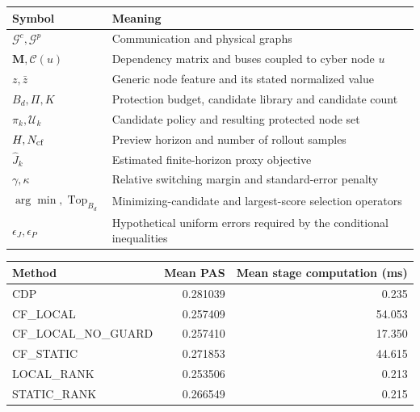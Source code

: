 \documentclass[10pt]{article}
\makeatletter
\newenvironment{exporttable}{\par\noindent\begin{minipage}{\linewidth}\def\@captype{table}}{\end{minipage}\par}
\makeatother
\begin{document}
\begin{exporttable}\centering\small
\caption{Key notation and interpretation.}\label{tab:notation}
\begin{tabularx}{\linewidth}{lX}\toprule
Symbol & Meaning\\\midrule
$\mathcal G^c,\mathcal G^p$ & Communication and physical graphs\\
$\mathbf M,\mathcal C(u)$ & Dependency matrix and buses coupled to cyber node $u$\\
$z,\bar z$ & Generic node feature and its stated normalized value\\
$B_d,\Pi,K$ & Protection budget, candidate library and candidate count\\
$\pi_k,\mathcal U_k$ & Candidate policy and resulting protected node set\\
$H,N_{\rm cf}$ & Preview horizon and number of rollout samples\\
$\widehat J_k$ & Estimated finite-horizon proxy objective\\
$\gamma,\kappa$ & Relative switching margin and standard-error penalty\\
$\arg\min,\operatorname{Top}_{B_d}$ & Minimizing-candidate and largest-score selection operators\\
$\epsilon_J,\epsilon_P$ & Hypothetical uniform errors required by the conditional inequalities\\
\bottomrule\end{tabularx}\end{exporttable}
\clearpage
\setcounter{table}{8}
\begin{exporttable}\centering\small
\caption{Two-candidate local-information descriptive all-mode means and recorded controller cost. Each method has 9600 outcomes and 28800 decisions.}\label{tab:revised_summary}
\begin{tabular}{lrr}\toprule Method & Mean PAS & Mean stage computation (ms)\\\midrule
CDP & 0.281039 & 0.235\\
CF\_LOCAL & 0.257409 & 54.053\\
CF\_LOCAL\_NO\_GUARD & 0.257410 & 17.350\\
CF\_STATIC & 0.271853 & 44.615\\
LOCAL\_RANK & 0.253506 & 0.213\\
STATIC\_RANK & 0.266549 & 0.215\\
\bottomrule\end{tabular}
\end{exporttable}
\clearpage
\setcounter{table}{9}
\end{document}
